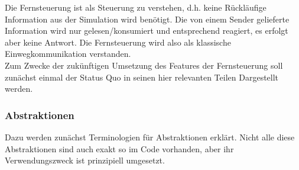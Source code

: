 Die Fernsteuerung ist als Steuerung zu verstehen, d.h. keine Rückläufige Information aus der Simulation wird benötigt. Die von einem Sender gelieferte Information wird nur gelesen/konsumiert und entsprechend reagiert, es erfolgt aber keine Antwort. Die Fernsteuerung wird also als klassische Einwegkommunikation verstanden.\\

Zum Zwecke der zukünftigen Umsetzung des Features der Fernsteuerung soll zunächst einmal der Status Quo in seinen hier relevanten Teilen Dargestellt werden. 

\subsubsection{Abstraktionen}
Dazu werden zunächst Terminologien für Abstraktionen erklärt. Nicht alle diese Abstraktionen sind auch exakt so im Code vorhanden, aber ihr Verwendungszweck ist prinzipiell umgesetzt. 




